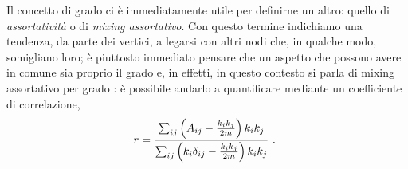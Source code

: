 Il concetto di grado ci è immediatamente utile per definirne un altro: quello di \emph{assortativit\`{a}} o di \emph{mixing assortativo}.
 Con questo termine indichiamo una tendenza, da parte dei vertici, a legarsi con altri nodi che, in qualche modo, somigliano loro; è piuttosto immediato pensare che un aspetto che possono avere in comune sia proprio il grado e, in effetti, in questo contesto si parla di mixing assortativo per grado \cite{Newman}: è possibile andarlo a quantificare mediante un coefficiente di correlazione,
\begin{equation}
	r = \frac{ \sum_{ij} \left( A_{ij} - \frac{k_i k_j}{2m} \right) k_i k_j}{\sum_{ij} \left(k_i \delta_{ij} - \frac{k_i k_j}{2m} \right) k_i k_j} $ . $
\end{equation}

